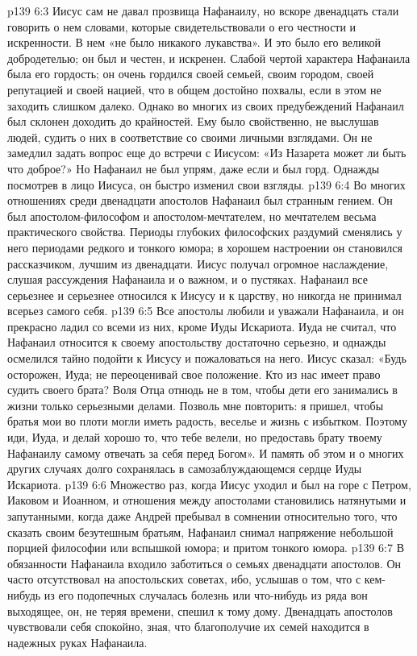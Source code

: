 \vs p139 6:3 \pc Иисус сам не давал прозвища Нафанаилу, но вскоре двенадцать стали говорить о нем словами, которые свидетельствовали о его честности и искренности. В нем «не было никакого лукавства». И это было его великой добродетелью; он был и честен, и искренен. Слабой чертой характера Нафанаила была его гордость; он очень гордился своей семьей, своим городом, своей репутацией и своей нацией, что в общем достойно похвалы, если в этом не заходить слишком далеко. Однако во многих из своих предубеждений Нафанаил был склонен доходить до крайностей. Ему было свойственно, не выслушав людей, судить о них в соответствие со своими личными взглядами. Он не замедлил задать вопрос еще до встречи с Иисусом: «Из Назарета может ли быть что доброе?» Но Нафанаил не был упрям, даже если и был горд. Однажды посмотрев в лицо Иисуса, он быстро изменил свои взгляды.
\vs p139 6:4 Во многих отношениях среди двенадцати апостолов Нафанаил был странным гением. Он был апостолом\hyp{}философом и апостолом\hyp{}мечтателем, но мечтателем весьма практического свойства. Периоды глубоких философских раздумий сменялись у него периодами редкого и тонкого юмора; в хорошем настроении он становился рассказчиком, лучшим из двенадцати. Иисус получал огромное наслаждение, слушая рассуждения Нафанаила и о важном, и о пустяках. Нафанаил все серьезнее и серьезнее относился к Иисусу и к царству, но никогда не принимал всерьез самого себя.
\vs p139 6:5 Все апостолы любили и уважали Нафанаила, и он прекрасно ладил со всеми из них, кроме Иуды Искариота. Иуда не считал, что Нафанаил относится к своему апостольству достаточно серьезно, и однажды осмелился тайно подойти к Иисусу и пожаловаться на него. Иисус сказал: «Будь осторожен, Иуда; не переоценивай свое положение. Кто из нас имеет право судить своего брата? Воля Отца отнюдь не в том, чтобы дети его занимались в жизни только серьезными делами. Позволь мне повторить: я пришел, чтобы братья мои во плоти могли иметь радость, веселье и жизнь с избытком. Поэтому иди, Иуда, и делай хорошо то, что тебе велели, но предоставь брату твоему Нафанаилу самому отвечать за себя перед Богом». И память об этом и о многих других случаях долго сохранялась в самозаблуждающемся сердце Иуды Искариота.
\vs p139 6:6 Множество раз, когда Иисус уходил и был на горе с Петром, Иаковом и Иоанном, и отношения между апостолами становились натянутыми и запутанными, когда даже Андрей пребывал в сомнении относительно того, что сказать своим безутешным братьям, Нафанаил снимал напряжение небольшой порцией философии или вспышкой юмора; и притом тонкого юмора.
\vs p139 6:7 В обязанности Нафанаила входило заботиться о семьях двенадцати апостолов. Он часто отсутствовал на апостольских советах, ибо, услышав о том, что с кем\hyp{}нибудь из его подопечных случалась болезнь или что\hyp{}нибудь из ряда вон выходящее, он, не теряя времени, спешил к тому дому. Двенадцать апостолов чувствовали себя спокойно, зная, что благополучие их семей находится в надежных руках Нафанаила.
